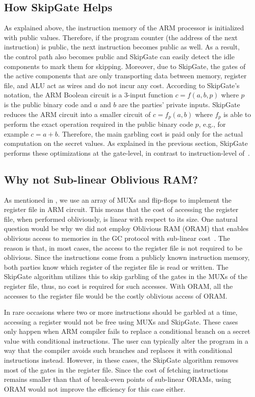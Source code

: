 \subsection{How SkipGate Helps}
As explained above, the instruction memory of the ARM processor is initialized with public values. Therefore, if the program counter (the address of the next instruction) is public, the next instruction becomes public as well.
As a result, the control path also becomes public and SkipGate can easily detect the idle components to mark them for skipping.
Moreover, due to SkipGate, the gates of the active components that are only transporting data between memory, register file, and ALU act as wires and do not incur any cost.
According to SkipGate's notation, the ARM Boolean circuit is a 3-input function $c = f(a,b,p)$ where $p$ is the public binary code and $a$ and $b$ are the parties' private inputs.
SkipGate reduces the ARM circuit into a smaller circuit of $c = f_p(a,b)$ where $f_p$ is able to perform the exact operation required in the public binary code $p$, e.g., for example $c = a + b$.
Therefore, the main garbling cost is paid only for the actual computation on the secret values.
As explained in the previous section, SkipGate performs these optimizations at the gate-level, in contrast to instruction-level of~\cite{wang2015secure, songhori2016garbledcpu}.

\subsection{Why not Sub-linear Oblivious RAM?}
As mentioned in , we use an array of MUXs and flip-flops to implement the register file in ARM circuit.
This means that the cost of accessing the register file, when performed obliviously, is linear with respect to its size.
One natural question would be why we did not employ Oblivious RAM (ORAM) that enables oblivious access to memories in the GC protocol with sub-linear cost~\cite{wang2014scoram, zahur2016revisit}.
The reason is that, in most cases, the access to the register file is not required to be oblivious.
Since the instructions come from a publicly known instruction memory, both parties know which register of the register file is read or written.
The SkipGate algorithm utilizes this to skip garbling of the gates in the MUXs of the register file, thus, no cost is required for such accesses.
With ORAM, all the accesses to the register file would be the costly oblivious access of ORAM.

In rare occasions where two or more instructions should be garbled at a time, accessing a register would not be free using MUXs and SkipGate.
These cases only happen when ARM compiler fails to replace a conditional branch on a secret value with conditional instructions.
The user can typically alter the program in a way that the compiler avoids such branches and replaces it with conditional instructions instead.
However, in these cases, the SkipGate algorithm removes most of the gates in the register file.
Since the cost of fetching instructions remains smaller than that of break-even points of sub-linear ORAMs, using ORAM would not improve the efficiency for this case either.

